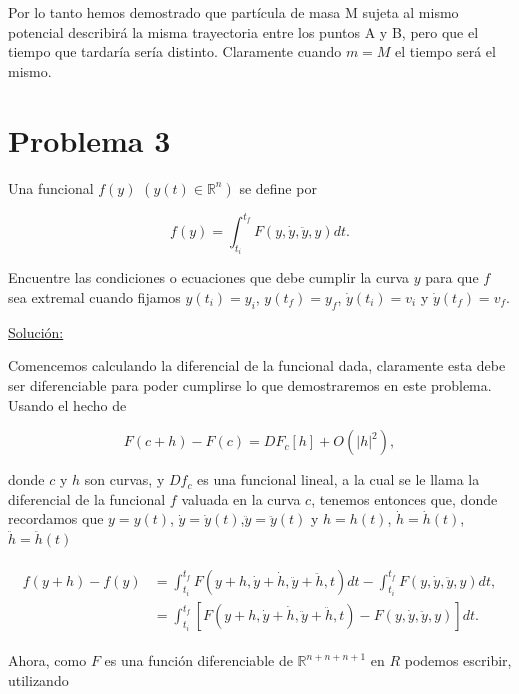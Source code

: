 \documentclass[a4paper,10pt]{article}
\numberwithin{equation}{section}
\begin{document}
Por lo tanto hemos demostrado que  partícula de masa M sujeta al mismo potencial 
describirá la misma trayectoria entre los puntos A y B, pero que el tiempo que tardaría sería distinto. Claramente cuando 
$m = M$ el tiempo será el mismo.





\section{Problema 3}

Una funcional $f(y)$ $(y(t) \in \mathbb{R}^n)$ se define por 

$$
f(y) = \int_{t_{i}}^{t_{f}} F(y,\dot{y},\ddot{y},y)dt.
$$

Encuentre las condiciones o ecuaciones que debe cumplir la curva $y$ para que $f$ sea
extremal cuando fijamos $y(t_i) = y_i$, $y(t_f)=y_f$, $\dot{y}(t_i) = v_i$ y
$\dot{y}(t_f) = v_f$.

\vspace{.3cm}

\underline{Solución:} \vspace{.3cm}

Comencemos calculando la diferencial de la funcional dada, claramente esta debe ser 
diferenciable para poder cumplirse lo que demostraremos en este problema. Usando 
el hecho de 

\begin{equation}
 F(c+h) - F(c) = DF_c[h]+O(|h|^2),
 \label{eq:diferencialFuncional1}
\end{equation}

donde $c$ y $h$ son curvas, y $Df_c$ es una funcional lineal, a la cual se le llama 
la diferencial de la funcional $f$ valuada en la curva $c$, tenemos entonces que, 
donde recordamos que $y = y(t)$, $\dot{y} = \dot{y}(t)$,$\ddot{y} = \ddot{y}(t)$ y $h=h(t)$, 
$\dot{h}=\dot{h}(t)$, $\ddot{h}=\ddot{h}(t)$

\begin{align}
\begin{split}
 f(y+h) - f(y) &= \int_{t_{i}}^{t_{f}} F(y+h,\dot{y}+ \dot{h}, \ddot{y} + \ddot{h}, t)dt -
 \int_{t_{i}}^{t_{f}} F(y,\dot{y},\ddot{y},y)dt, \\
	       &= \int_{t_{i}}^{t_{f}} \left[ F(y+h,\dot{y}+ \dot{h}, \ddot{y} + \ddot{h}, t)
	       -F(y,\dot{y},\ddot{y},y) \right]dt.
 \end{split}
\end{align}

Ahora, como $F$ es una función diferenciable de $\mathbb{R}^{n+n+n+1}$ en $R$ podemos 
escribir, utilizando 
\end{document}

